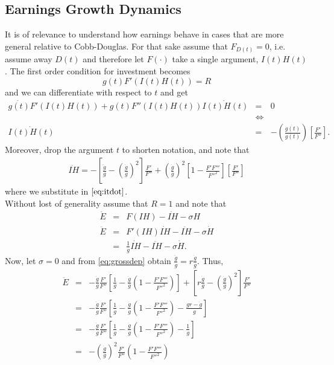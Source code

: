 \subsection{Earnings Growth Dynamics}
It is of relevance to understand how earnings behave in cases that are more general relative to Cobb-Douglas. For that sake assume that $F_{D(t)} = 0 $, i.e. assume away $D(t)$ and therefore let $F(\cdot)$ take a single argument, $I(t) H(t)$. The first order condition for investment becomes
\begin{equation}
g(t) F'(I(t) H(t)) = R
\end{equation}
and we can differentiate with respect to $t$ and get
\begin{eqnarray}
\dot{g(t)} F'(I(t) H(t)) + g(t) F''(I(t) H(t)) \dot{I(t) H(t)} &=& 0 \nonumber \\
&\Leftrightarrow& \nonumber \\
\dot{I(t) H(t)} &=& - \left( \frac{\dot{g(t)}}{g(t)} \right) \left[ \frac{F'}{F''}\right] \label{eq:itdot}.
\end{eqnarray}
\noindent Moreover, drop the argument $t$ to shorten notation, and note that
\begin{eqnarray}
\ddot{IH} = - \left[ \frac{\ddot{g}}{g} - \left( \frac{\dot{g}}{g} \right)^2 \right] \frac{F'}{F''} + \left( \frac{\dot{g}}{g} \right)^2 \left[ 1 - \frac{F'F'''}{{F''}^2} \right] \left[ \frac{F'}{F''} \right]  
\end{eqnarray}  
where we substitute in $\eqref{eq:itdot}$.\\
\indent Without lost of generality assume that $R = 1$ and note that
\begin{eqnarray}
\dot{E} &=& F(IH) - \dot{IH} - \sigma H \nonumber \\
\ddot{E} &=& F'(IH) \dot{IH} - \ddot{IH} - \sigma \dot{H} \nonumber \\
&=& \frac{1}{g} \dot{IH} - \ddot{IH} - \sigma \dot{H}.
\end{eqnarray}
Now, let $\sigma = 0$ and from \eqref{eq:grossdep} obtain $\frac{\ddot{g}}{g} = r \frac{\dot{g}}{g}$. Thus,
\begin{eqnarray}
\ddot{E} &=& - \frac{\dot{g}}{g} \frac{F'}{F''} \left[ \frac{1}{g} - \frac{\dot{g}}{g} \left( 1 - \frac{F'F'''}{{F''}^2} \right) \right] + \left[ r \frac{\dot{g}}{g} - \left( \frac{\dot{g}}{g} \right)^2 \right] \frac{F'}{F''} \nonumber \\
&=& - \frac{\dot{g}}{g} \frac{F'}{F''} \left[ \frac{1}{g} - \frac{\dot{g}}{g} \left( 1 - \frac{F'F'''}{{F''}^2} \right) - \frac{gr - \dot{g}}{g} \right] \nonumber \\
&=& - \frac{\dot{g}}{g} \frac{F'}{F''} \left[ \frac{1}{g} - \frac{\dot{g}}{g} \left( 1 - \frac{F'F'''}{{F''}^2} \right) - \frac{1}{g} \right] \nonumber \\
&=& - \left( \frac{\dot{g}}{g} \right)^2 \frac{F'}{F''} \left( 1 - \frac{F'F'''}{{F''}^2} \right)
\end{eqnarray}

